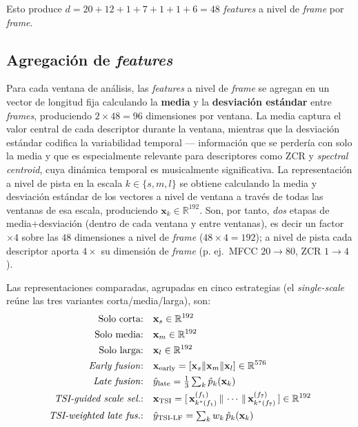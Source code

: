 \documentclass[conference]{IEEEtran}
\begin{document}
Esto produce $d = 20 + 12 + 1 + 7 + 1 + 1 + 6 = 48$ \textit{features} a nivel de \textit{frame} por \textit{frame}.

\subsection{Agregación de \textit{features}}

Para cada ventana de análisis, las \textit{features} a nivel de \textit{frame} se agregan en un vector de longitud fija calculando la \textbf{media} y la \textbf{desviación estándar} entre \textit{frames}, produciendo $2 \times 48 = 96$ dimensiones por ventana.
La media captura el valor central de cada descriptor durante la ventana, mientras que la desviación estándar codifica la variabilidad temporal --- información que se perdería con solo la media y que es especialmente relevante para descriptores como ZCR y \textit{spectral 
centroid}, cuya dinámica temporal es musicalmente significativa.
La representación a nivel de pista en la escala $k \in \{s, m, l\}$ se obtiene calculando la media y desviación estándar de los vectores a nivel de ventana a través de todas las ventanas de esa escala, produciendo $\mathbf{x}_k \in \mathbb{R}^{192}$. Son, por tanto, \emph{dos} etapas de media+desviación (dentro de cada ventana y entre ventanas), es decir un factor $\times 4$ sobre las $48$ dimensiones a nivel de \textit{frame} ($48\times4=192$); a nivel de pista cada descriptor aporta $4\times$ su dimensión de \textit{frame} (p. ej.\ MFCC $20\to80$, ZCR $1\to4$).

Las representaciones comparadas, agrupadas en cinco estrategias (el \textit{single-scale} reúne las tres variantes corta/media/larga), son:
\begin{align}
    \text{Solo corta:}  \quad & \mathbf{x}_s \in \mathbb{R}^{192} \\
    \text{Solo media:}  \quad & \mathbf{x}_m \in \mathbb{R}^{192} \\
    \text{Solo larga:}  \quad & \mathbf{x}_l \in \mathbb{R}^{192} \\
    \text{\textit{Early fusion}:} \quad &
        \mathbf{x}_{\text{early}} = [\mathbf{x}_s \| \mathbf{x}_m \|
        \mathbf{x}_l] \in \mathbb{R}^{576} \\
    \text{\textit{Late fusion}:} \quad &
        \hat{y}_{\text{late}} = \tfrac{1}{3}
        \textstyle\sum_{k} \hat{p}_k(\mathbf{x}_k) \\
    \text{\textit{TSI-guided scale sel.}:} \quad &
        \mathbf{x}_{\text{TSI}} =
        [\,\mathbf{x}^{(f_1)}_{k^*(f_1)} \,\|\, \cdots \,\|\,
        \mathbf{x}^{(f_7)}_{k^*(f_7)}\,] \in \mathbb{R}^{192} \\
    \text{\textit{TSI-weighted late fus.}:} \quad &
        \hat{y}_{\text{TSI-LF}} =
        \textstyle\sum_{k} w_k\,\hat{p}_k(\mathbf{x}_k)
\end{align}
\end{document}
